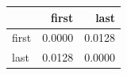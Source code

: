 \begin{tabular}{lrr}
\toprule
 & first & last \\
\midrule
first & 0.0000 & 0.0128 \\
last & 0.0128 & 0.0000 \\
\bottomrule
\end{tabular}
